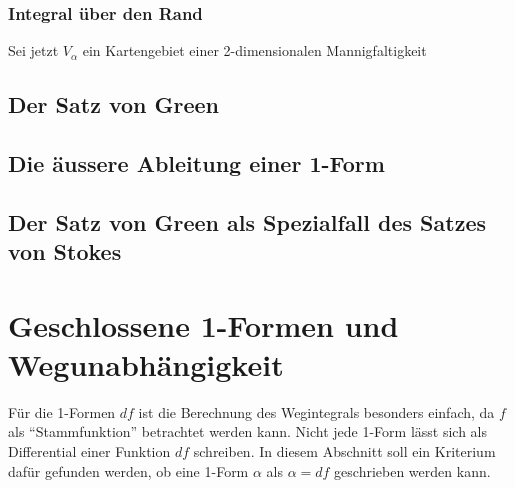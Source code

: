 
%
%
\subsubsection{Integral über den Rand}
%
Sei jetzt $V_\alpha$ ein Kartengebiet einer 2-dimensionalen
Mannigfaltigkeit

%
%
\subsection{Der Satz von Green}

%
%
\subsection{Die äussere Ableitung einer 1-Form}

%
%
\subsection{Der Satz von Green als Spezialfall des Satzes von Stokes}

%
%
\section{Geschlossene 1-Formen und Wegunabhängigkeit
\label{buch:green:section:geschlossen}}
Für die 1-Formen $df$ ist die Berechnung des Wegintegrals besonders
einfach, da $f$ als ``Stammfunktion'' betrachtet werden kann.
Nicht jede 1-Form lässt sich als Differential einer Funktion $df$ 
schreiben.
In diesem Abschnitt soll ein Kriterium dafür gefunden werden, 
ob eine 1-Form $\alpha$ als $\alpha=df$ geschrieben werden kann.

%
%
